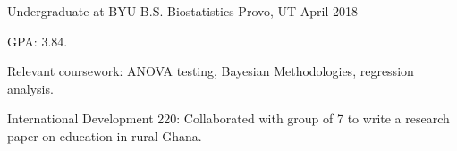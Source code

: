 \begin{cventries}
  \cventry
    {Undergraduate at BYU}
    {B.S. Biostatistics}
    {Provo, UT}
    {April 2018}
    {\begin{cvitems}
    \item {GPA: 3.84.}
    \item{Relevant coursework: ANOVA testing, Bayesian Methodologies, regression analysis.}
        \item {International Development 220: Collaborated with group of 7 to write a research paper on education in rural Ghana.}
    \end{cvitems}
    }
  
\end{cventries}

